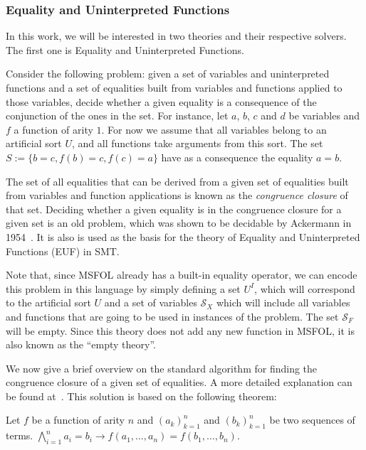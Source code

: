 \subsubsection{Equality and Uninterpreted Functions}\label{sec:euf}

In this work, we will be interested in two theories and their respective solvers. The first one is Equality and Uninterpreted Functions.

Consider the following problem: given a set of variables and uninterpreted functions and a set of equalities built from variables and functions applied to those variables, decide whether a given equality is a consequence of the conjunction of the ones in the set. For instance, let $a$, $b$, $c$ and $d$ be variables and $f$ a function of arity $1$. For now we assume that all variables belong to an artificial sort $U$, and all functions take arguments from this sort. The set $S := \{b = c, f(b) = c, f(c) = a\}$ have as a consequence the equality $a = b$.

The set of all equalities that can be derived from a given set of equalities built from variables and function applications is known as the \textit{congruence closure} of that set. Deciding whether a given equality is in the congruence closure for a given set is an old problem, which was shown to be decidable by Ackermann in 1954~\cite{ack_cong}. It is also is used as the basis for the theory of Equality and Uninterpreted Functions (EUF) in SMT.\

Note that, since MSFOL already has a built-in equality operator, we can encode this problem in this language by simply defining a set $U^{I}$, which will correspond to the artificial sort $U$ and a set of variables $\mathcal{S}_{X}$ which will include all variables and functions that are going to be used in instances of the problem. The set $\mathcal{S}_{F}$ will be empty. Since this theory does not add any new function in MSFOL, it is also known as the ``empty theory''.

We now give a brief overview on the standard algorithm for finding the congruence closure of a given set of equalities. A more detailed explanation can be found at~\cite{orig_cong_clos}. This solution is based on the following theorem:

\begin{theorem}[Congruence]\label{cong_theorem}
Let $f$ be a function of arity $n$ and ${(a_{k})}_{k = 1}^{n}$ and ${(b_{k})}_{k = 1}^{n}$ be two sequences of terms. $\bigwedge_{i = 1}^{n} a_{i} = b_{i} \rightarrow f(a_{1}, \ldots, a_{n}) = f(b_{1}, \ldots, b_{n})$.
\end{theorem}

